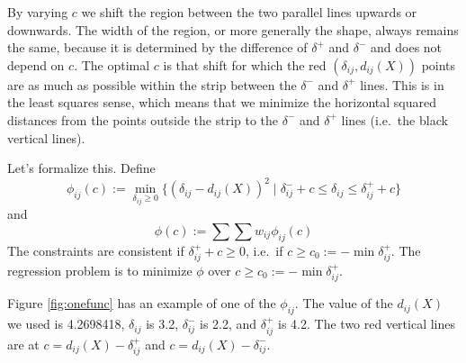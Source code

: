 \documentclass[
  12pt,
]{article}
\begin{document}
By varying \(c\) we shift the region between the two parallel lines upwards or downwards. The width of the region, or more generally the shape, always remains the same, because it is determined by the difference of \(\delta^+\) and \(\delta^-\) and does not depend on \(c\). The
optimal \(c\) is that shift for which the red \((\delta_{ij},d_{ij}(X))\) points are as much as possible within the strip between the \(\delta^-\) and \(\delta^+\) lines. This is in the least squares sense, which means that we minimize the horizontal squared distances from the points outside the strip to the \(\delta^-\) and \(\delta^+\) lines (i.e.~the black vertical lines).

Let's formalize this. Define
\begin{equation}
\phi_{ij}(c):=\min_{\delta_{ij}\geq 0}\{(\delta_{ij}-d_{ij}(X))^2\mid \delta^-_{ij}+c\leq\delta_{ij}\leq\delta^+_{ij}+c\}
\label{eq:phiijdef}
\end{equation}
and
\begin{equation}
\phi(c):=\sum\sum w_{ij}\phi_{ij}(c)
\label{eq:phidef}
\end{equation}
The constraints are consistent if \(\delta_{ij}^++c\geq 0\), i.e.~if \(c\geq c_0:=-\min\delta_{ij}^+\).
The regression problem is to minimize \(\phi\) over \(c\geq c_0:=-\min\delta_{ij}^+\).

Figure \ref{fig:onefunc} has an example of one of the \(\phi_{ij}\). The value of the
\(d_{ij}(X)\) we used is 4.2698418, \(\delta_{ij}\) is 3.2, \(\delta_{ij}^-\) is 2.2, and \(\delta_{ij}^+\) is 4.2.
The two red vertical lines
are at \(c=d_{ij}(X)-\delta_{ij}^+\) and \(c=d_{ij}(X)-\delta_{ij}^-\).
\end{document}
